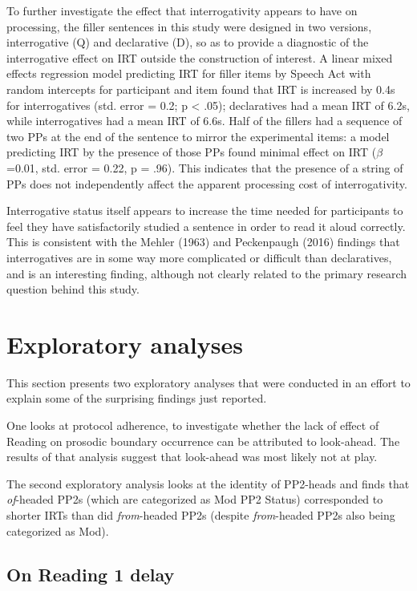 \documentclass[11pt,oneside]{book}
\begin{document}
To further investigate the effect that interrogativity appears to have on processing, the filler sentences in this study were designed in two versions, interrogative (Q) and declarative (D), so as to provide a diagnostic of the interrogative effect on IRT outside the construction of interest. A linear mixed effects regression model predicting IRT for filler items by Speech Act with random intercepts for participant and item found that IRT is increased by 0.4s for interrogatives (std. error = 0.2; p \textless{} .05); declaratives had a mean IRT of 6.2s, while interrogatives had a mean IRT of 6.6s. Half of the fillers had a sequence of two PPs at the end of the sentence to mirror the experimental items: a model predicting IRT by the presence of those PPs found minimal effect on IRT (\(\beta\)=0.01, std. error = 0.22, p = .96). This indicates that the presence of a string of PPs does not independently affect the apparent processing cost of interrogativity.

Interrogative status itself appears to increase the time needed for participants to feel they have satisfactorily studied a sentence in order to read it aloud correctly. This is consistent with the Mehler (1963) and Peckenpaugh (2016) findings that interrogatives are in some way more complicated or difficult than declaratives, and is an interesting finding, although not clearly related to the primary research question behind this study.

\hypertarget{exploratory-analyses}{%
\section{Exploratory analyses}\label{exploratory-analyses}}

This section presents two exploratory analyses that were conducted in an effort to explain some of the surprising findings just reported.

One looks at protocol adherence, to investigate whether the lack of effect of Reading on prosodic boundary occurrence can be attributed to look-ahead. The results of that analysis suggest that look-ahead was most likely not at play.

The second exploratory analysis looks at the identity of PP2-heads and finds that \emph{of}-headed PP2s (which are categorized as Mod PP2 Status) corresponded to shorter IRTs than did \emph{from}-headed PP2s (despite \emph{from}-headed PP2s also being categorized as Mod).

\hypertarget{r1del}{%
\subsection{On Reading 1 delay}\label{r1del}}
\end{document}
